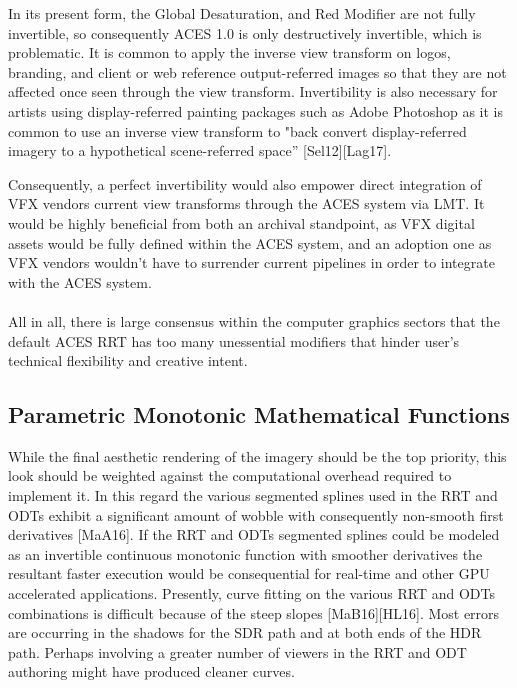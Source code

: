 \documentclass[conference]{IEEEtran}
\begin{document}
In its present form, the Global Desaturation, and Red Modifier are not fully invertible, so consequently ACES 1.0 is only destructively invertible, which is problematic. It is common to apply the inverse view transform on logos, branding, and client or web reference output-referred images so that they are not affected once seen through the view transform. Invertibility is also necessary for artists using display-referred painting packages such as Adobe Photoshop as it is common to use an inverse view transform to "back convert display-referred imagery to a hypothetical scene-referred space” [Sel12][Lag17].

Consequently, a perfect invertibility would also empower direct integration of VFX vendors current view transforms through the ACES system via LMT. It would be highly beneficial from both an archival standpoint, as VFX digital assets would be fully defined within the ACES system, and an adoption one as VFX vendors wouldn't have to surrender current pipelines in order to integrate with the ACES system.
\\ \\
All in all, there is large consensus within the computer graphics sectors that the default ACES RRT has too many unessential modifiers that hinder user's technical flexibility and creative intent.

\subsection{Parametric Monotonic Mathematical Functions}
While the final aesthetic rendering of the imagery should be the top priority, this look should be weighted against the computational overhead required to implement it. In this regard the various segmented splines used in the RRT and ODTs exhibit a significant amount of wobble with consequently non-smooth first derivatives [MaA16]. If the RRT and ODTs segmented splines could be modeled as an invertible continuous monotonic function with smoother derivatives the resultant faster execution would be consequential for real-time and other GPU accelerated applications. Presently, curve fitting on the various RRT and ODTs combinations is difficult because of the steep slopes [MaB16][HL16]. Most errors are occurring in the shadows for the SDR path and at both ends of the HDR path. Perhaps involving a greater number of viewers in the RRT and ODT authoring might have produced cleaner curves.
\end{document}
